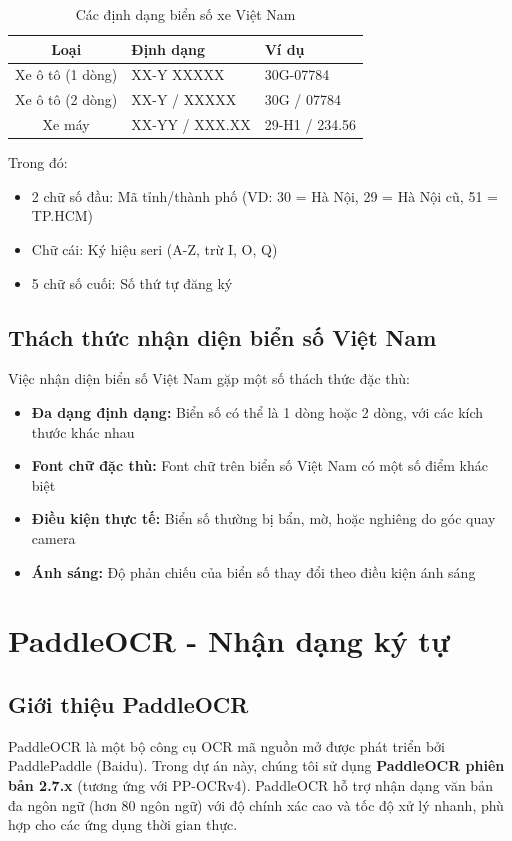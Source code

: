 \begin{table}[!ht]
\centering
\caption{Các định dạng biển số xe Việt Nam}
\label{tab:vn_plate_format}
\begin{tabular}{|c|l|l|}
\hline
\textbf{Loại} & \textbf{Định dạng} & \textbf{Ví dụ} \\ \hline
Xe ô tô (1 dòng) & XX-Y XXXXX & 30G-07784 \\ \hline
Xe ô tô (2 dòng) & XX-Y / XXXXX & 30G / 07784 \\ \hline
Xe máy & XX-YY / XXX.XX & 29-H1 / 234.56 \\ \hline
\end{tabular}
\end{table}

Trong đó:
\begin{itemize}
    \item 2 chữ số đầu: Mã tỉnh/thành phố (VD: 30 = Hà Nội, 29 = Hà Nội cũ, 51 = TP.HCM)
    \item Chữ cái: Ký hiệu seri (A-Z, trừ I, O, Q)
    \item 5 chữ số cuối: Số thứ tự đăng ký
\end{itemize}

\subsection{Thách thức nhận diện biển số Việt Nam}
Việc nhận diện biển số Việt Nam gặp một số thách thức đặc thù:
\begin{itemize}
    \item \textbf{Đa dạng định dạng:} Biển số có thể là 1 dòng hoặc 2 dòng, với các kích thước khác nhau
    \item \textbf{Font chữ đặc thù:} Font chữ trên biển số Việt Nam có một số điểm khác biệt
    \item \textbf{Điều kiện thực tế:} Biển số thường bị bẩn, mờ, hoặc nghiêng do góc quay camera
    \item \textbf{Ánh sáng:} Độ phản chiếu của biển số thay đổi theo điều kiện ánh sáng
\end{itemize}

\section{PaddleOCR - Nhận dạng ký tự}

\subsection{Giới thiệu PaddleOCR}
PaddleOCR là một bộ công cụ OCR mã nguồn mở được phát triển bởi PaddlePaddle (Baidu). Trong dự án này, chúng tôi sử dụng \textbf{PaddleOCR phiên bản 2.7.x} (tương ứng với PP-OCRv4). PaddleOCR hỗ trợ nhận dạng văn bản đa ngôn ngữ (hơn 80 ngôn ngữ) với độ chính xác cao và tốc độ xử lý nhanh, phù hợp cho các ứng dụng thời gian thực. 

